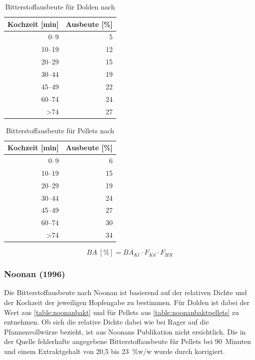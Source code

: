 \documentclass[a4paper,parskip=half]{scrartcl}
\newcommand{\BA}{\mathit{BA}}
\newcommand{\BAKt}{{\mathit{BA}}_{\mathit{Kt}}}
\newcommand{\uper}{\:[\text{\%}]}
\newcommand{\FKd}{F_{\mathit{Kd}}}
\newcommand{\FHR}{F_{\mathit{HR}}}
\begin{document}
\begin{table}[H]
\centering
\begin{tabular}{rr}
\toprule
\multicolumn{1}{c}{\textbf{Kochzeit [min]}} & \multicolumn{1}{c}{\textbf{Ausbeute [\%]}} \\
\midrule
0–9            & 5  \\
10–19          & 12 \\
20–29          & 15 \\
30–44          & 19 \\
45–49          & 22 \\
60–74          & 24 \\
>74            & 27 \\
\bottomrule
\end{tabular}
\caption{Bitterstoffausbeute für Dolden nach \citeauthor{Daniels1996} \parencite[80]{Daniels1996}}
\label{table:danielsbakt}
\end{table}

\begin{table}[H]
\centering
\begin{tabular}{rr}
\toprule
\multicolumn{1}{c}{\textbf{Kochzeit [min]}} & \multicolumn{1}{c}{\textbf{Ausbeute [\%]}} \\
\midrule
0–9            & 6 \\
10–19          & 15 \\
20–29          & 19 \\
30–44          & 24 \\
45–49          & 27 \\
60–74          & 30 \\
>74            & 34 \\
\bottomrule
\end{tabular}
\caption{Bitterstoffausbeute für Pellets nach \citeauthor{Daniels1996} \parencite[80]{Daniels1996}}
\label{table:danielsbaktpellets}
\end{table}

\begin{equation}
\BA \uper = \BAKt \cdot \FKd \cdot \FHR
\label{eq:danielsba}
\end{equation}


\subsubsection*{Noonan (1996)}

Die Bitterstoffausbeute nach Noonan ist basierend auf der relativen Dichte und
der Kochzeit der jeweiligen Hopfengabe zu bestimmen. Für Dolden ist
dabei der Wert aus \autoref{table:noonanbakt} und für Pellets aus
\autoref{table:noonanbaktpellets} zu entnehmen. Ob sich die
relative Dichte dabei wie bei Rager auf die Pfannenvollwürze
bezieht, ist aus Noonans Publikation nicht ersichtlich. Die in der Quelle
fehlerhafte angegebene Bitterstoffausbeute für Pellets bei 90~Minuten und
einem Extraktgehalt von 20,5 bis 23~\%w/w wurde durch korrigiert.
\end{document}
